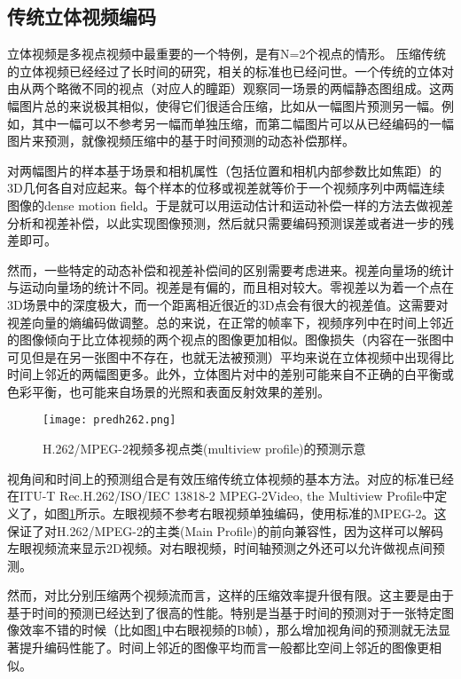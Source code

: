 \subsection{传统立体视频编码}

立体视频是多视点视频中最重要的一个特例，是有N=2个视点的情形。 压缩传统的立体视频已经经过了长时间的研究，相关的标准也已经问世。一个传统的立体对由从两个略微不同的视点（对应人的瞳距）观察同一场景的两幅静态图组成。这两幅图片总的来说极其相似，使得它们很适合压缩，比如从一幅图片预测另一幅。例如，其中一幅可以不参考另一幅而单独压缩，而第二幅图片可以从已经编码的一幅图片来预测，就像视频压缩中的基于时间预测的动态补偿那样。
 
对两幅图片的样本基于场景和相机属性（包括位置和相机内部参数比如焦距）的3D几何各自对应起来。每个样本的位移或视差就等价于一个视频序列中两幅连续图像的dense motion field。于是就可以用运动估计和运动补偿一样的方法去做视差分析和视差补偿，以此实现图像预测，然后就只需要编码预测误差或者进一步的残差即可。

然而，一些特定的动态补偿和视差补偿间的区别需要考虑进来。视差向量场的统计与运动向量场的统计不同。视差是有偏的，而且相对较大。零视差以为着一个点在 3D场景中的深度极大，而一个距离相近很近的3D点会有很大的视差值。这需要对视差向量的熵编码做调整。总的来说，在正常的帧率下，视频序列中在时间上邻近的图像倾向于比立体视频的两个视点的图像更加相似。图像损失（内容在一张图中可见但是在另一张图中不存在，也就无法被预测）平均来说在立体视频中出现得比时间上邻近的两幅图更多。此外，立体图片对中的差别可能来自不正确的白平衡或色彩平衡，也可能来自场景的光照和表面反射效果的差别。 

\begin{figure}[htbp]
\begin{center}
\texttt{[image: predh262.png]}
\caption{H.262/MPEG-2视频多视点类(multiview profile)的预测示意}
\label{fig:predh262chs}
\end{center}
\end{figure}

视角间和时间上的预测组合是有效压缩传统立体视频的基本方法。对应的标准已经在ITU-T Rec.H.262/ISO/IEC 13818-2 MPEG-2Video, the Multiview Profile\cite{haskell1997digital, itu1994mpeg2}中定义了，如图\ref{fig:predh262chs}所示。左眼视频不参考右眼视频单独编码，使用标准的MPEG-2。这保证了对H.262/MPEG-2的主类(Main Profile)的前向兼容性，因为这样可以解码左眼视频流来显示2D视频。对右眼视频，时间轴预测之外还可以允许做视点间预测。
 
然而，对比分别压缩两个视频流而言，这样的压缩效率提升很有限。这主要是由于基于时间的预测已经达到了很高的性能。特别是当基于时间的预测对于一张特定图像效率不错的时候（比如图\ref{fig:predh262chs}中右眼视频的B帧），那么增加视角间的预测就无法显著提升编码性能了。时间上邻近的图像平均而言一般都比空间上邻近的图像更相似。

